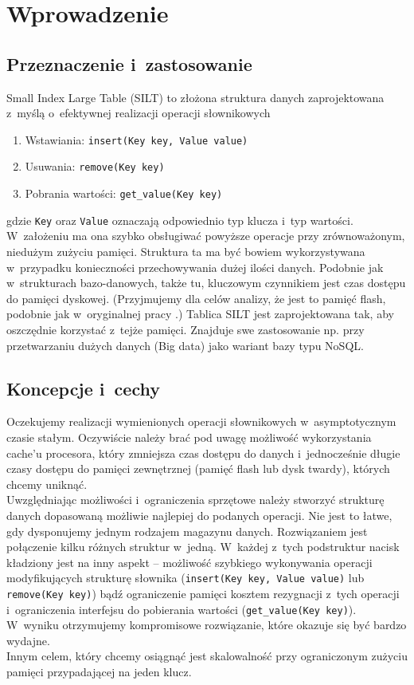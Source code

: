 \documentclass[declaration,shortabstract,masc]{iithesis}
\author{Paweł Guzewicz}
\begin{document}
	\chapter{Wprowadzenie}
		\section{Przeznaczenie i~zastosowanie}
			Small Index Large Table (SILT) to złożona struktura danych zaprojektowana z~myślą o~efektywnej realizacji operacji słownikowych
			\begin{enumerate}
				\item
					Wstawiania: \texttt{insert(Key key, Value value)}
				\item
					Usuwania: \texttt{remove(Key key)}
				\item
					Pobrania wartości: \texttt{get\_value(Key key)}
			\end{enumerate}
			gdzie \texttt{Key} oraz \texttt{Value} oznaczają odpowiednio typ klucza i~typ wartości.\\
			\indent W~założeniu ma ona szybko obsługiwać powyższe operacje przy zrównoważonym, niedużym zużyciu pamięci. Struktura ta ma być bowiem wykorzystywana w~przypadku konieczności przechowywania dużej ilości danych. Podobnie jak w~strukturach bazo-danowych, także tu, kluczowym czynnikiem jest czas dostępu do pamięci dyskowej. (Przyjmujemy dla celów analizy, że jest to pamięć flash, podobnie jak w~oryginalnej pracy \cite{SILT}.) Tablica SILT jest zaprojektowana tak, aby oszczędnie korzystać z~tejże pamięci. Znajduje swe zastosowanie np. przy przetwarzaniu dużych danych (Big data) jako wariant bazy typu NoSQL.
		\section{Koncepcje i~cechy}
			Oczekujemy realizacji wymienionych operacji słownikowych w~asymptotycznym czasie stałym. Oczywiście należy brać pod uwagę możliwość wykorzystania cache'u procesora, który zmniejsza czas dostępu do danych i~jednocześnie długie czasy dostępu do pamięci zewnętrznej (pamięć flash lub dysk twardy), których chcemy uniknąć.\\
			\indent Uwzględniając możliwości i~ograniczenia sprzętowe należy stworzyć strukturę danych dopasowaną możliwie najlepiej do podanych operacji. Nie jest to łatwe, gdy dysponujemy jednym rodzajem magazynu danych. Rozwiązaniem jest połączenie kilku różnych struktur w~jedną. W~każdej z~tych podstruktur nacisk kładziony jest na inny aspekt -- możliwość szybkiego wykonywania operacji modyfikujących strukturę słownika (\texttt{insert(Key key, Value value)} lub \texttt{remove(Key key)}) bądź ograniczenie pamięci kosztem rezygnacji z~tych operacji i~ograniczenia interfejsu do pobierania wartości (\texttt{get\_value(Key key)}). W~wyniku otrzymujemy kompromisowe rozwiązanie, które okazuje się być bardzo wydajne.\\
			\indent Innym celem, który chcemy osiągnąć jest skalowalność przy ograniczonym zużyciu pamięci przypadającej na jeden klucz.
\end{document}
